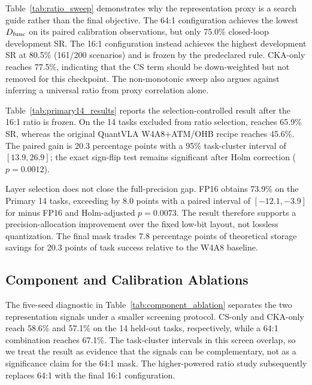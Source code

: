 Table~\ref{tab:ratio_sweep} demonstrates why the representation proxy is a search guide rather than the final objective. The 64:1 configuration achieves the lowest $D_{\mathrm{func}}$ on its paired calibration observations, but only 75.0\% closed-loop development SR. The 16:1 configuration instead achieves the highest development SR at 80.5\% (161/200 scenarios) and is frozen by the predeclared rule. CKA-only reaches 77.5\%, indicating that the CS term should be down-weighted but not removed for this checkpoint. The non-monotonic sweep also argues against inferring a universal ratio from proxy correlation alone.



Table~\ref{tab:primary14_results} reports the selection-controlled result after the 16:1 ratio is frozen. On the 14 tasks excluded from ratio selection, \method reaches 65.9\% SR, whereas the original QuantVLA W4A8+ATM/OHB recipe reaches 45.6\%. The paired gain is 20.3 percentage points with a 95\% task-cluster interval of $[13.9,26.9]$; the exact sign-flip test remains significant after Holm correction ($p=0.0012$).

Layer selection does not close the full-precision gap. FP16 obtains 73.9\% on the Primary 14 tasks, exceeding \method by 8.0 points with a paired interval of $[-12.1,-3.9]$ for \method minus FP16 and Holm-adjusted $p=0.0073$. The result therefore supports a precision-allocation improvement over the fixed low-bit layout, not lossless quantization. The final mask trades 7.8 percentage points of theoretical storage savings for 20.3 points of task success relative to the W4A8 baseline.

\subsection{Component and Calibration Ablations}
\label{sec:ablations}



The five-seed diagnostic in Table~\ref{tab:component_ablation} separates the two representation signals under a smaller screening protocol. CS-only and CKA-only reach 58.6\% and 57.1\% on the 14 held-out tasks, respectively, while a 64:1 combination reaches 67.1\%. The task-cluster intervals in this screen overlap, so we treat the result as evidence that the signals can be complementary, not as a significance claim for the 64:1 mask. The higher-powered ratio study subsequently replaces 64:1 with the final 16:1 configuration.

